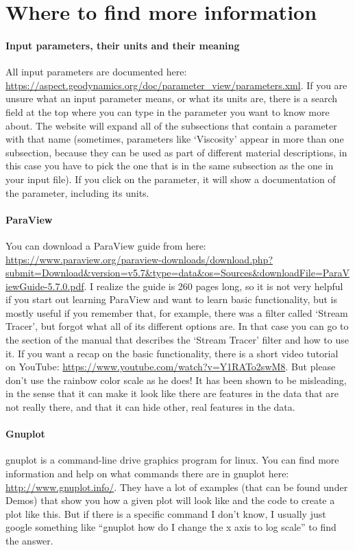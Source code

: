 \documentclass[notitlepage]{article}
\begin{document}
\section{Where to find more information}

\paragraph{Input parameters, their units and their meaning}
All input parameters are documented here: \url{https://aspect.geodynamics.org/doc/parameter_view/parameters.xml}. 
If you are unsure what an input parameter means, or what its units are, there is a search field at the top where you can type in the parameter you want to know more about. The website will expand all of the subsections that contain a parameter with that name (sometimes, parameters like `Viscosity' appear in more than one subsection, because they can be used as part of different material descriptions, in this case you have to pick the one that is in the same subsection as the one in your input file). If you click on the parameter, it will show a documentation of the parameter, including its units. 

\paragraph{ParaView}
You can download a ParaView guide from here: \url{https://www.paraview.org/paraview-downloads/download.php?submit=Download&version=v5.7&type=data&os=Sources&downloadFile=ParaViewGuide-5.7.0.pdf}. I realize the guide is 260 pages long, so it is not very helpful if you start out learning ParaView and want to learn basic functionality, but is mostly useful if you remember that, for example, there was a filter called `Stream Tracer', but forgot what all of its different options are. In that case you can go to the section of the manual that describes the `Stream Tracer' filter and how to use it. 
If you want a recap on the basic functionality, there is a short video tutorial on YouTube: \url{https://www.youtube.com/watch?v=Y1RATo2swM8}. But please don't use the rainbow color scale as he does! It has been shown to be misleading, in the sense that it can make it look like there are features in the data that are not really there, and that it can hide other, real features in the data. 

\paragraph{Gnuplot}
gnuplot is a command-line drive graphics program for linux. 
You can find more information and help on what commands there are in gnuplot here: \url{http://www.gnuplot.info/}. They have a lot of examples (that can be found under Demos) that show you how a given plot will look like and the code to create a plot like this. 
But if there is a specific command I don't know, I usually just google something like ``gnuplot how do I change the x axis to log scale'' to find the answer. 
\end{document}

